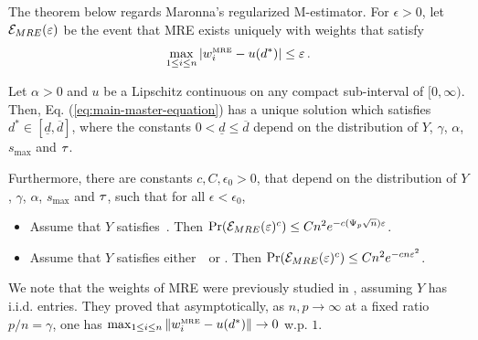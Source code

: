 \documentclass[times,sort&compress,3p]{elsarticle}
\begin{document}
The theorem below regards Maronna's regularized M-estimator. For $\epsilon>0$, let $\mathcal{E}_{MRE}(\varepsilon)$ be the event that MRE exists uniquely with weights that satisfy 
        \begin{equation}
            \max_{1\le i \le n} |w^{\mbox{\tiny{MRE}}}_i-u(d^*)| \le \varepsilon\,.
        \end{equation}

\begin{theorem}
    \label{thm:main_maronna_reg}
    Let $\alpha>0$ and $u$ be a Lipschitz continuous on any compact sub-interval of $[0,\infty)$. Then,
    Eq. (\ref{eq:main-master-equation}) has a unique solution which satisfies $d^*\in [\underline{d},\overline{d}]$, where 
    the constants $0<\underline{d}\le \overline{d}$ depend on the distribution of $Y$, $\gamma$, $\alpha$, $s_{\max}$ and $\tau$. 

    Furthermore, there are constants $c,C,\epsilon_0>0$, that depend on the distribution of $Y$, $\gamma$, $\alpha$, $s_{\max}$ and $\tau$, such that for all $\epsilon< \epsilon_0$,
        \begin{itemize}
            \item Assume that $Y$ satisfies~\AssumLC. Then $\Pr(\mathcal{E}_{MRE}(\varepsilon)^c) \le Cn^2e^{-c(\Psi_p\sqrt{n})\varepsilon}$.  
            \item Assume that $Y$ satisfies either~\AssumIndep~or \AssumCCPSB. Then ${\Pr(\mathcal{E}_{MRE}(\varepsilon)^c) \le Cn^2e^{-cn\varepsilon^2}}$.  
        \end{itemize}
    \end{theorem}
We note that the weights of MRE were previously studied in \cite{auguin2018large}, 
assuming $Y$ has i.i.d. entries.
They proved that asymptotically, as $n,p\to\infty$ at a fixed ratio $p/n=\gamma$,
one has
$\max_{1\le i \le n}\|w^{\mbox{\tiny{MRE}}}_i-u(d^*)\| \to 0$ w.p. $1$. 

\end{document}
